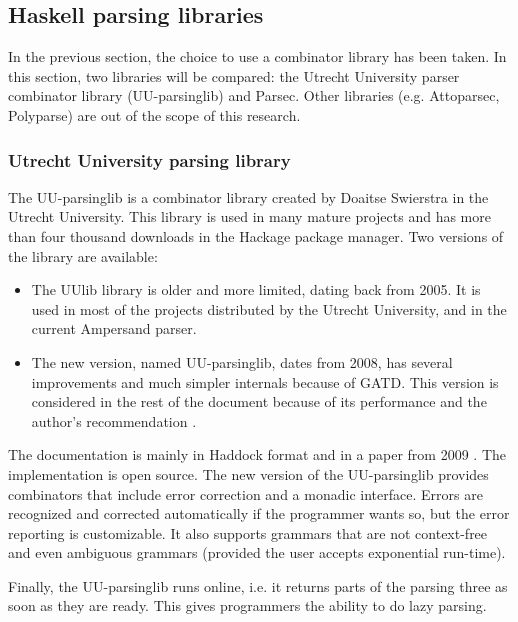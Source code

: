 
\subsection{Haskell parsing libraries}
\label{parsing:libraries}
In the previous section, the choice to use a combinator library has been taken.
In this section, two libraries will be compared: the Utrecht University parser combinator library (UU-parsinglib) and Parsec.
Other libraries (e.g. Attoparsec, Polyparse) are out of the scope of this research.

\subsubsection{Utrecht University parsing library}
%
%
%
The UU-parsinglib is a combinator library created by Doaitse Swierstra in the Utrecht University.
This library is used in many mature projects and has more than four thousand downloads in the Hackage package manager.
Two versions of the library are available:
\begin{itemize}
  \item The UUlib library is older and more limited, dating back from 2005.
    It is used in most of the projects distributed by the Utrecht University, and in the current Ampersand parser.
  \item The new version, named UU-parsinglib, dates from 2008, has several improvements and much simpler internals because of GATD.
    This version is considered in the rest of the document because of its performance  and the author's recommendation .
\end{itemize}
%
The documentation is mainly in Haddock format and in a paper from 2009 .
The implementation is open source.
The new version of the UU-parsinglib provides combinators that include error correction and a monadic interface.
Errors are recognized and corrected automatically if the programmer wants so, but the error reporting is customizable.
It also supports grammars that are not context-free and even ambiguous grammars (provided the user accepts exponential run-time).

Finally, the UU-parsinglib runs online, i.e. it returns parts of the parsing three as soon as they are ready.
This gives programmers the ability to do lazy parsing.

